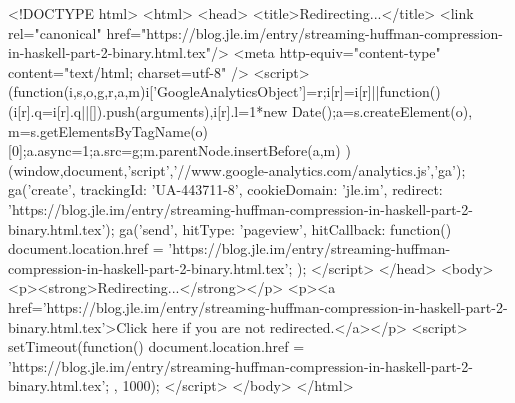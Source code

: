 <!DOCTYPE html>
<html>
<head>
<title>Redirecting...</title>
<link rel="canonical" href="https://blog.jle.im/entry/streaming-huffman-compression-in-haskell-part-2-binary.html.tex"/>
<meta http-equiv="content-type" content="text/html; charset=utf-8" />
<script>
(function(i,s,o,g,r,a,m){i['GoogleAnalyticsObject']=r;i[r]=i[r]||function(){
(i[r].q=i[r].q||[]).push(arguments)},i[r].l=1*new Date();a=s.createElement(o),
m=s.getElementsByTagName(o)[0];a.async=1;a.src=g;m.parentNode.insertBefore(a,m)
})(window,document,'script','//www.google-analytics.com/analytics.js','ga');
ga('create', { trackingId: 'UA-443711-8', cookieDomain: 'jle.im', redirect: 'https://blog.jle.im/entry/streaming-huffman-compression-in-haskell-part-2-binary.html.tex'});
ga('send', { hitType: 'pageview', hitCallback: function() { document.location.href = 'https://blog.jle.im/entry/streaming-huffman-compression-in-haskell-part-2-binary.html.tex'; } });
</script>
</head>
<body>
  <p><strong>Redirecting...</strong></p>
  <p><a href='https://blog.jle.im/entry/streaming-huffman-compression-in-haskell-part-2-binary.html.tex'>Click here if you are not redirected.</a></p>
  <script>
    setTimeout(function() { document.location.href = 'https://blog.jle.im/entry/streaming-huffman-compression-in-haskell-part-2-binary.html.tex'; }, 1000);
  </script>
</body>
</html>

